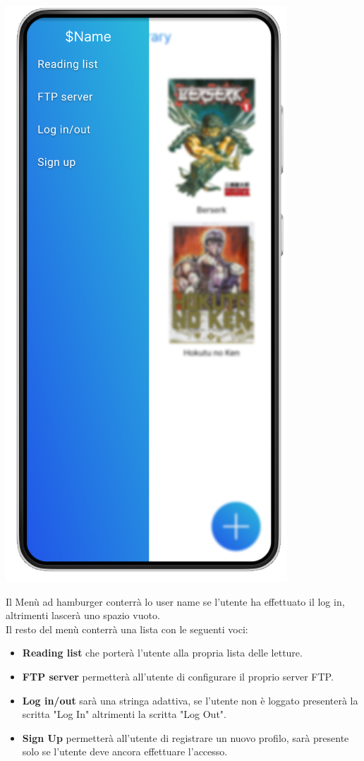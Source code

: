 \documentclass{report}
\begin{document}
\begin{center}
   \includegraphics[scale=0.4]{hamburger.png}
\end{center}

Il Menù ad hamburger conterrà lo user name se l'utente ha effettuato il log in, altrimenti lascerà uno spazio vuoto.\\
Il resto del menù conterrà una lista con le seguenti voci:
\begin{itemize}
   \item \textbf{Reading list} che porterà l'utente alla propria lista delle letture.
   \item \textbf{FTP server} permetterà all'utente di configurare il proprio server FTP.
   \item \textbf{Log in/out} sarà una stringa adattiva, se l'utente non è loggato presenterà la scritta "Log In" altrimenti la scritta "Log Out".
   \item \textbf{Sign Up} permetterà all'utente di registrare un nuovo profilo, sarà presente solo se l'utente deve ancora effettuare l'accesso.
\end{itemize}
\end{document}
